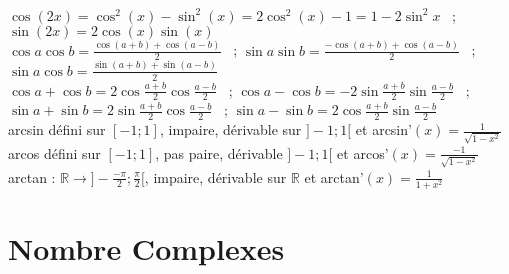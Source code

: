 \documentclass[12 pt]{exampleclass}
\begin{document}
\begin{flushleft}
\begin{doublespace}
	\text{ } \\
	$ \cos(2x) = \cos^2(x) - \sin^2(x) = 2 \cos^2(x) - 1 = 1- 2 \sin^2{x}$ \ ; $\sin(2x)= 2 \cos(x) \sin(x)$ \\
	$ \cos a \cos b = \frac{\cos(a+b) + \cos(a-b)}{2}$ \ ; $\sin a \sin b = \frac{- \cos(a+b) + \cos(a-b)}{2}$ \ ; $\sin a \cos b = \frac{\sin(a+b) + \sin(a-b)}{2}$ \\
	$ \cos a + \cos b = 2 \cos \frac{a+b}{2} \cos \frac{a-b}{2}$ \ ; $\cos a - \cos b = -2 \sin \frac{a+b}{2} \sin \frac{a-b}{2}$ \ ; $\sin a + \sin b = 2 \sin \frac{a+b}{2} \cos \frac{a-b}{2}$ \ ; $\sin a - \sin b = 2 \cos\frac{a+b}{2} \sin\frac{a-b}{2}$ \\
	arcsin défini sur $[-1;1]$, impaire, dérivable sur $]-1;1[ $ et arcsin'$(x) = \frac{1}{\sqrt{1-x^2}}$ \\
	arcos défini sur $[-1;1]$, pas paire, dérivable $]-1;1[$ et arcos'$(x) = \frac{-1}{\sqrt{1-x^2}}$ \\
	arctan : $\mathbb{R} \rightarrow ]-\frac{-\pi}{2} ; \frac{\pi}{2}[$, impaire, dérivable sur $\mathbb{R}$ et arctan'$(x) = \frac{1}{1+x^2}$\\

\end{doublespace}
\end{flushleft}

\section{Nombre Complexes}
\end{document}
